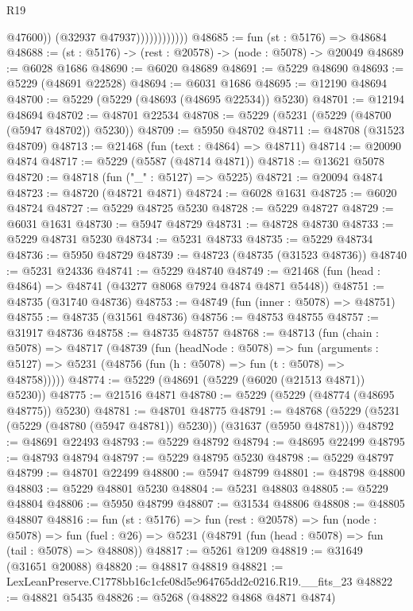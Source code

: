 \begin{lexlean}{R19}
\begin{coremodule}
                              @47600))
                          (@32937 @47937))))))))))))
@48685 := fun (st : @5176) => @48684
@48688 := (st : @5176) -> (rest : @20578) -> (node : @5078) -> @20049
@48689 := @6028 @1686
@48690 := @6020 @48689
@48691 := @5229 @48690
@48693 := @5229 (@48691 @22528)
@48694 := @6031 @1686
@48695 := @12190 @48694
@48700 := @5229 (@5229 (@48693 (@48695 @22534)) @5230)
@48701 := @12194 @48694
@48702 := @48701 @22534
@48708 := @5229 (@5231 (@5229 (@48700 (@5947 @48702)) @5230))
@48709 := @5950 @48702
@48711 := @48708 (@31523 @48709)
@48713 := @21468 (fun (text : @4864) => @48711)
@48714 := @20090 @4874
@48717 := @5229 (@5587 (@48714 @4871))
@48718 := @13621 @5078
@48720 := @48718 (fun ("_" : @5127) => @5225)
@48721 := @20094 @4874
@48723 := @48720 (@48721 @4871)
@48724 := @6028 @1631
@48725 := @6020 @48724
@48727 := @5229 @48725 @5230
@48728 := @5229 @48727
@48729 := @6031 @1631
@48730 := @5947 @48729
@48731 := @48728 @48730
@48733 := @5229 @48731 @5230
@48734 := @5231 @48733
@48735 := @5229 @48734
@48736 := @5950 @48729
@48739 := @48723 (@48735 (@31523 @48736))
@48740 := @5231 @24336
@48741 := @5229 @48740
@48749 := @21468 (fun (head : @4864) => @48741 (@43277 @8068 @7924 @4874 @4871 @5448))
@48751 := @48735 (@31740 @48736)
@48753 := @48749 (fun (inner : @5078) => @48751)
@48755 := @48735 (@31561 @48736)
@48756 := @48753 @48755
@48757 := @31917 @48736
@48758 := @48735 @48757
@48768 := @48713
    (fun (chain : @5078) =>
    @48717
      (@48739
        (fun (headNode : @5078) =>
        fun (arguments : @5127) => @5231 (@48756 (fun (h : @5078) => fun (t : @5078) => @48758)))))
@48774 := @5229 (@48691 (@5229 (@6020 (@21513 @4871)) @5230))
@48775 := @21516 @4871
@48780 := @5229 (@5229 (@48774 (@48695 @48775)) @5230)
@48781 := @48701 @48775
@48791 := @48768 (@5229 (@5231 (@5229 (@48780 (@5947 @48781)) @5230)) (@31637 (@5950 @48781)))
@48792 := @48691 @22493
@48793 := @5229 @48792
@48794 := @48695 @22499
@48795 := @48793 @48794
@48797 := @5229 @48795 @5230
@48798 := @5229 @48797
@48799 := @48701 @22499
@48800 := @5947 @48799
@48801 := @48798 @48800
@48803 := @5229 @48801 @5230
@48804 := @5231 @48803
@48805 := @5229 @48804
@48806 := @5950 @48799
@48807 := @31534 @48806
@48808 := @48805 @48807
@48816 := fun (st : @5176) =>
  fun (rest : @20578) =>
  fun (node : @5078) =>
  fun (fuel : @26) => @5231 (@48791 (fun (head : @5078) => fun (tail : @5078) => @48808))
@48817 := @5261 @1209
@48819 := @31649 (@31651 @20088)
@48820 := @48817 @48819
@48821 := LexLeanPreserve.C1778bb16c1cfe08d5e964765dd2c0216.R19.__fits_23
@48822 := @48821 @5435
@48826 := @5268 (@48822 @4868 @4871 @4874)

\end{coremodule}
\end{lexlean}
